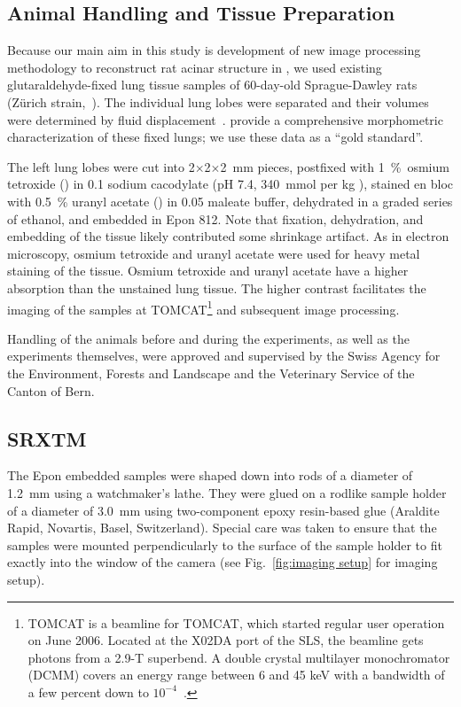 \subsection[Animal Handling]{Animal Handling and Tissue Preparation}
Because our main aim in this study is development of new image processing methodology to reconstruct rat acinar structure in \threed, we used existing glutaraldehyde-fixed lung tissue samples of 60-day-old Sprague-Dawley rats (Zürich strain,~\cite{Tschanz2003}). The individual lung lobes were separated and their volumes were determined by fluid displacement~\cite{Scherle1970}. \citet{Tschanz2003} provide a comprehensive morphometric characterization of these fixed lungs; we use these data as a ``gold standard''.

The left lung lobes were cut into 2$\times$2$\times$\SI{2}{\milli\meter} pieces, postfixed with \SI{1}{\percent}~osmium tetroxide () in \SI{0.1}{\Molar} sodium cacodylate (pH 7.4, \SI{340}{\mmol} per \si{\kilogram} ), stained en bloc with \SI{0.5}{\percent} uranyl acetate () in \SI{0.05}{\Molar} maleate buffer, dehydrated in a graded series of ethanol, and embedded in Epon 812. Note that fixation, dehydration, and embedding of the tissue likely contributed some shrinkage artifact. As in electron microscopy, osmium tetroxide and uranyl acetate were used for heavy metal staining of the tissue. Osmium tetroxide and uranyl acetate have a higher absorption than the unstained lung tissue. The higher contrast facilitates the imaging of the samples at \ac{TOMCAT}\footnote{\ac{TOMCAT} is a beamline for \acl{TOMCAT}, which started regular user operation on June 2006. Located at the X02DA port of the \ac{SLS}, the beamline gets photons from a 2.9-T superbend. A double crystal multilayer monochromator (DCMM) covers an energy range between 6 and 45 keV with a bandwidth of a few percent down to $10^{-4}$~\cite{Stampanoni2007}.} and subsequent image processing.

Handling of the animals before and during the experiments, as well as the experiments themselves, were approved and supervised by the Swiss Agency for the Environment, Forests and Landscape and the Veterinary Service of the Canton of Bern.

\subsection{SRXTM}
The Epon embedded samples were shaped down into rods of a diameter of \SI{1.2}{\milli\meter} using a watchmaker's lathe. They were glued on a rodlike sample holder of a diameter of \SI{3.0}{\milli\meter} using two-component epoxy resin-based glue (Araldite Rapid, Novartis, Basel, Switzerland). Special care was taken to ensure that the samples were mounted perpendicularly to the surface of the sample holder to fit exactly into the window of the camera (see Fig.~\ref{fig:imaging setup} for imaging setup).

